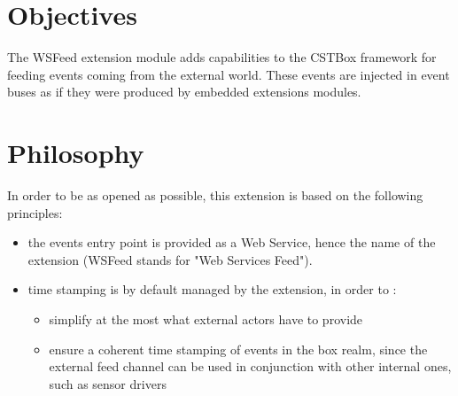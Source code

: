 \documentclass[11pt,a4paper]{article}
\author{Eric PASCUAL}
\title{\thetitle}
\date{Sep. 29, 2015}
\newcommand{\cbx}{CSTBox\xspace}
\newcommand{\wsf}{WSFeed\xspace}
\begin{document}
\maketitle

\begin{abstract}
This document describes the \wsf extension module for the \cbx.
\end{abstract}

\begin{versionhistory}
\end{versionhistory}

\setcounter{table}{0}	%

\clearpage
\tableofcontents

\clearpage
\setlength{\parskip}{0.5em}
\setlength{\parindent}{0pt}

\section{Objectives}

The \wsf extension module adds capabilities to the \cbx framework for feeding events 
coming from the external world. These events are injected in event buses as if they were 
produced by embedded extensions modules.

\section{Philosophy}

In order to be as opened as possible, this extension is based on the following principles:
\begin{itemize}
\item the events entry point is provided as a Web Service, 
hence the name of the extension (\wsf stands for "Web Services Feed").
\item time stamping is by default managed by the extension, in order to :
\begin{itemize}
\item simplify at the most what external actors have to provide
\item ensure a coherent time stamping of events in the box realm, since the external feed 
channel can be used in conjunction with other internal ones, such as sensor drivers
\end{itemize}
\end{itemize}
\end{document}
